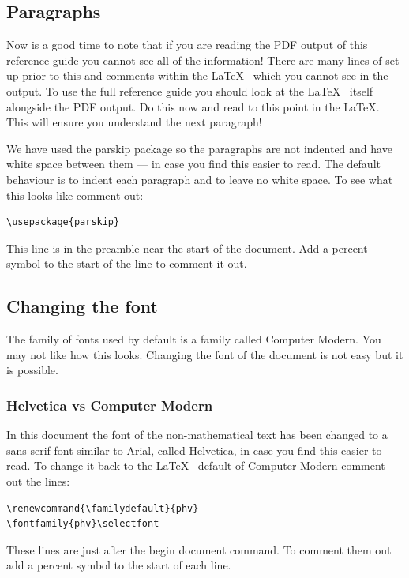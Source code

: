 \documentclass[a4paper,14pt]{extarticle}
\begin{document}
\subsection{Paragraphs}

Now is a good time to note that if you are reading the PDF output of this reference guide you cannot see all of the information! There are many lines of set-up prior to this and comments within the \LaTeX~ which you cannot see in the output. To use the full reference guide you should look at the \LaTeX~ itself alongside the PDF output. Do this now and read to this point in the \LaTeX. This will ensure you understand the next paragraph! 

We have used the parskip package so the paragraphs are not indented and have white space between them --- in case you find this easier to read. The default behaviour is to indent each paragraph and to leave no white space. To see what this looks like comment out:
\begin{verbatim}
\usepackage{parskip}
\end{verbatim}
This line is in the preamble near the start of the document. Add a percent symbol to the start of the line to comment it out. 

\subsection{Changing the font}

The family of fonts used by default is a family called Computer Modern. You may not like how this looks. Changing the font of the document is not easy but it is possible. 

\subsubsection*{Helvetica vs Computer Modern}

In this document the font of the non-mathematical text has been changed to a sans-serif font similar to Arial, called Helvetica, in case you find this easier to read. To change it back to the \LaTeX~ default of Computer Modern comment out the lines:
\begin{verbatim}
\renewcommand{\familydefault}{phv}
\fontfamily{phv}\selectfont
\end{verbatim}
These lines are just after the begin document command. To comment them out add a percent symbol to the start of each line. 
\end{document}
